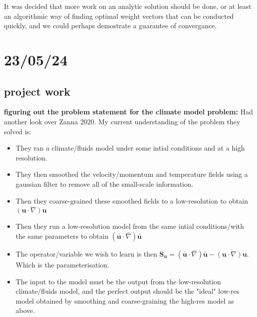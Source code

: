 \documentclass[11pt,a4paper]{article}
\begin{document}
It was decided that more work on an analytic solution should be done, or at least an algorithmic way of finding optimal weight vectors that can be conducted quickly, and we could perhaps demostrate a guarantee of convergance.

\section{23/05/24}

\subsection{project work}

\textbf{figuring out the problem statement for the climate model problem:}
Had another look over Zanna 2020.
My current understanding of the problem they solved is:
\begin{itemize}
  \item They ran a climate/fluids model under some intial conditions and at a high resolution.
  \item They then smoothed the velocity/momentum and temperature fields using a gaussian filter to remove all of the small-scale information.
  \item Then they coarse-grained these smoothed fields to a low-resolution to obtain $\overline{(\mathbf{u}\cdot \nabla)\mathbf{u}}$
  \item Then they run a low-resolution model from the same intial conditions/with the same parameters to obtain $(\bar{\mathbf{u}}\cdot \bar{\nabla})\bar{\mathbf{u}}$
  \item The operator/variable we wish to learn is then $\mathbf{S_u} = (\bar{\mathbf{u}}\cdot \bar{\nabla})\bar{\mathbf{u}} - \overline{(\mathbf{u}\cdot \nabla)\mathbf{u}}$. Which is the parameterisation.
  \item The input to the model must be the output from the low-resolution climate/fluids model, and the perfect output should be the "ideal" low-res model obtained by smoothing and coarse-graining the high-res model as above.
\end{itemize}
\end{document}
